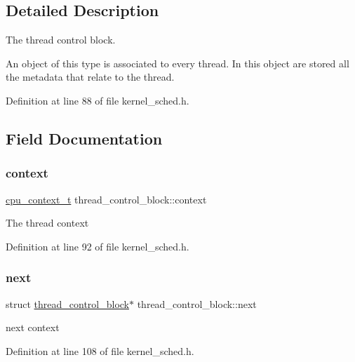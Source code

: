\subsection{Detailed Description}
The thread control block. 

An object of this type is associated to every thread. In this object are stored all the metadata that relate to the thread. 

Definition at line 88 of file kernel\+\_\+sched.\+h.



\subsection{Field Documentation}
\mbox{\label{structthread__control__block_a9c107039dffa851dde6edabd6cd3f89c}} 
\subsubsection{\texorpdfstring{context}{context}}
{\footnotesize\ttfamily \hyperlink{bios_8h_a6067c1395a75fc3e17f1ea6353065b54}{cpu\+\_\+context\+\_\+t} thread\+\_\+control\+\_\+block\+::context}

The thread context 

Definition at line 92 of file kernel\+\_\+sched.\+h.

\mbox{\label{structthread__control__block_ac6b51ca735291f730ca1d4c335fb9359}} 
\subsubsection{\texorpdfstring{next}{next}}
{\footnotesize\ttfamily struct \hyperlink{structthread__control__block}{thread\+\_\+control\+\_\+block}$\ast$ thread\+\_\+control\+\_\+block\+::next}

next context 

Definition at line 108 of file kernel\+\_\+sched.\+h.

\mbox{\label{structthread__control__block_a74aa312623cb8be2bc719d5210b58c04}} 

